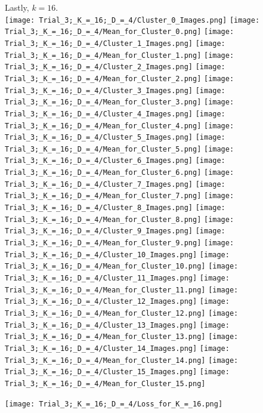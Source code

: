 \documentclass[submit]{harvardml}
\begin{document}
	Lastly, $k = 16$. \\
	\texttt{[image: Trial\_3;\_K\_=\_16;\_D\_=\_4/Cluster\_0\_Images.png]}
	\texttt{[image: Trial\_3;\_K\_=\_16;\_D\_=\_4/Mean\_for\_Cluster\_0.png]}
	\texttt{[image: Trial\_3;\_K\_=\_16;\_D\_=\_4/Cluster\_1\_Images.png]}
	\texttt{[image: Trial\_3;\_K\_=\_16;\_D\_=\_4/Mean\_for\_Cluster\_1.png]}
	\texttt{[image: Trial\_3;\_K\_=\_16;\_D\_=\_4/Cluster\_2\_Images.png]}
	\texttt{[image: Trial\_3;\_K\_=\_16;\_D\_=\_4/Mean\_for\_Cluster\_2.png]}
	\texttt{[image: Trial\_3;\_K\_=\_16;\_D\_=\_4/Cluster\_3\_Images.png]}
	\texttt{[image: Trial\_3;\_K\_=\_16;\_D\_=\_4/Mean\_for\_Cluster\_3.png]}
	\texttt{[image: Trial\_3;\_K\_=\_16;\_D\_=\_4/Cluster\_4\_Images.png]}
	\texttt{[image: Trial\_3;\_K\_=\_16;\_D\_=\_4/Mean\_for\_Cluster\_4.png]}
	\texttt{[image: Trial\_3;\_K\_=\_16;\_D\_=\_4/Cluster\_5\_Images.png]}
	\texttt{[image: Trial\_3;\_K\_=\_16;\_D\_=\_4/Mean\_for\_Cluster\_5.png]}
	\texttt{[image: Trial\_3;\_K\_=\_16;\_D\_=\_4/Cluster\_6\_Images.png]}
	\texttt{[image: Trial\_3;\_K\_=\_16;\_D\_=\_4/Mean\_for\_Cluster\_6.png]}
	\texttt{[image: Trial\_3;\_K\_=\_16;\_D\_=\_4/Cluster\_7\_Images.png]}
	\texttt{[image: Trial\_3;\_K\_=\_16;\_D\_=\_4/Mean\_for\_Cluster\_7.png]}
	\texttt{[image: Trial\_3;\_K\_=\_16;\_D\_=\_4/Cluster\_8\_Images.png]}
	\texttt{[image: Trial\_3;\_K\_=\_16;\_D\_=\_4/Mean\_for\_Cluster\_8.png]}
	\texttt{[image: Trial\_3;\_K\_=\_16;\_D\_=\_4/Cluster\_9\_Images.png]}
	\texttt{[image: Trial\_3;\_K\_=\_16;\_D\_=\_4/Mean\_for\_Cluster\_9.png]}
	\texttt{[image: Trial\_3;\_K\_=\_16;\_D\_=\_4/Cluster\_10\_Images.png]}
	\texttt{[image: Trial\_3;\_K\_=\_16;\_D\_=\_4/Mean\_for\_Cluster\_10.png]}
	\texttt{[image: Trial\_3;\_K\_=\_16;\_D\_=\_4/Cluster\_11\_Images.png]}
	\texttt{[image: Trial\_3;\_K\_=\_16;\_D\_=\_4/Mean\_for\_Cluster\_11.png]}
	\texttt{[image: Trial\_3;\_K\_=\_16;\_D\_=\_4/Cluster\_12\_Images.png]}
	\texttt{[image: Trial\_3;\_K\_=\_16;\_D\_=\_4/Mean\_for\_Cluster\_12.png]}
	\texttt{[image: Trial\_3;\_K\_=\_16;\_D\_=\_4/Cluster\_13\_Images.png]}
	\texttt{[image: Trial\_3;\_K\_=\_16;\_D\_=\_4/Mean\_for\_Cluster\_13.png]}
	\texttt{[image: Trial\_3;\_K\_=\_16;\_D\_=\_4/Cluster\_14\_Images.png]}
	\texttt{[image: Trial\_3;\_K\_=\_16;\_D\_=\_4/Mean\_for\_Cluster\_14.png]}
	\texttt{[image: Trial\_3;\_K\_=\_16;\_D\_=\_4/Cluster\_15\_Images.png]}
	\texttt{[image: Trial\_3;\_K\_=\_16;\_D\_=\_4/Mean\_for\_Cluster\_15.png]}
	
	\texttt{[image: Trial\_3;\_K\_=\_16;\_D\_=\_4/Loss\_for\_K\_=\_16.png]}
	
\end{document}
